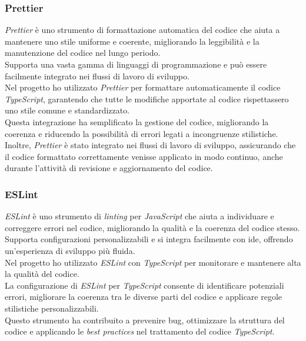\subsubsection{Prettier}

\textit{Prettier} è uno strumento di formattazione automatica del codice che aiuta a mantenere uno stile uniforme e coerente, migliorando la leggibilità e la manutenzione del codice nel lungo periodo.\\
Supporta una vasta gamma di linguaggi di programmazione e può essere facilmente integrato nei flussi di lavoro di sviluppo.\\

\noindent Nel progetto ho utilizzato \textit{Prettier} per formattare automaticamente il codice \textit{TypeScript}, garantendo che tutte le modifiche apportate al codice rispettassero uno stile comune e standardizzato.\\
Questa integrazione ha semplificato la gestione del codice, migliorando la coerenza e riducendo la possibilità di errori legati a incongruenze stilistiche. \\
Inoltre, \textit{Prettier} è stato integrato nei flussi di lavoro di sviluppo, assicurando che il codice formattato correttamente venisse applicato in modo continuo, anche durante l'attività di revisione e aggiornamento del codice.

\subsubsection{ESLint}

\textit{ESLint} è uno strumento di \textit{linting} per \textit{JavaScript} che aiuta a individuare e correggere errori nel codice, migliorando la qualità e la coerenza del codice stesso.\\
Supporta configurazioni personalizzabili e si integra facilmente con \gls{ide}, offrendo un'esperienza di sviluppo più fluida.\\

\noindent Nel progetto ho utilizzato \textit{ESLint} con \textit{TypeScript} per monitorare e mantenere alta la qualità del codice. \\
La configurazione di \textit{ESLint} per \textit{TypeScript} consente di identificare potenziali errori, migliorare la coerenza tra le diverse parti del codice e applicare regole stilistiche personalizzabili.\\
Questo strumento ha contribuito a prevenire bug, ottimizzare la struttura del codice e applicando le \textit{best practices} nel trattamento del codice \textit{TypeScript}.

